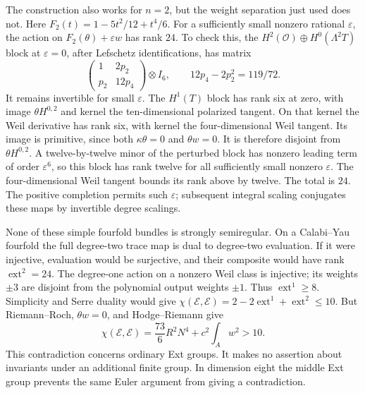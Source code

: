 The construction also works for $n=2$, but the weight separation
just used does not.  Here
$F_2(t)=1-5t^2/12+t^4/6$.
For a sufficiently small nonzero rational $\varepsilon$, the action
on $F_2(\theta)+\varepsilon w$ has rank $24$.
To check this, the $H^2(\mathcal O)\oplus H^0(\Lambda^2T)$ block
at $\varepsilon=0$, after Lefschetz identifications, has matrix
\[
 \begin{pmatrix}1&2p_2\\p_2&12p_4\end{pmatrix}\otimes I_6,
 \qquad 12p_4-2p_2^2=119/72.
\]
It remains invertible for small $\varepsilon$.
The $H^1(T)$ block has rank six at zero, with image
$\theta H^{0,2}$ and kernel the ten-dimensional polarized tangent.
On that kernel the Weil derivative has rank six, with kernel the
four-dimensional Weil tangent.  Its image is primitive, since
both $\kappa\theta=0$ and $\theta w=0$.
It is therefore disjoint from $\theta H^{0,2}$.
A twelve-by-twelve minor of the perturbed block has nonzero leading
term of order $\varepsilon^6$, so this block has rank twelve for
all sufficiently small nonzero $\varepsilon$.  The four-dimensional
Weil tangent bounds its rank above by twelve.  The total is $24$.
The positive completion permits such $\varepsilon$; subsequent
integral scaling conjugates these maps by invertible degree scalings.

None of these simple fourfold bundles is strongly semiregular.
On a Calabi--Yau fourfold the full degree-two trace map is dual to
degree-two evaluation.  If it were injective, evaluation would be
surjective, and their composite would have rank
$\operatorname{ext}^2=24$.
The degree-one action on a nonzero Weil class is injective; its
weights $\pm3$ are disjoint from the polynomial output weights
$\pm1$.  Thus $\operatorname{ext}^1\ge8$.
Simplicity and Serre duality would give
$\chi(\mathcal E,\mathcal E)=2-2\operatorname{ext}^1+
\operatorname{ext}^2\le10$.
But Riemann--Roch, $\theta w=0$, and Hodge--Riemann give
\[
 \chi(\mathcal E,\mathcal E)
 =\frac{73}{6}R^2N^4+c^2\int_Aw^2>10.
\]
This contradiction concerns ordinary Ext groups.  It makes no
assertion about invariants under an additional finite group.
In dimension eight the middle Ext group prevents the same Euler
argument from giving a contradiction.
